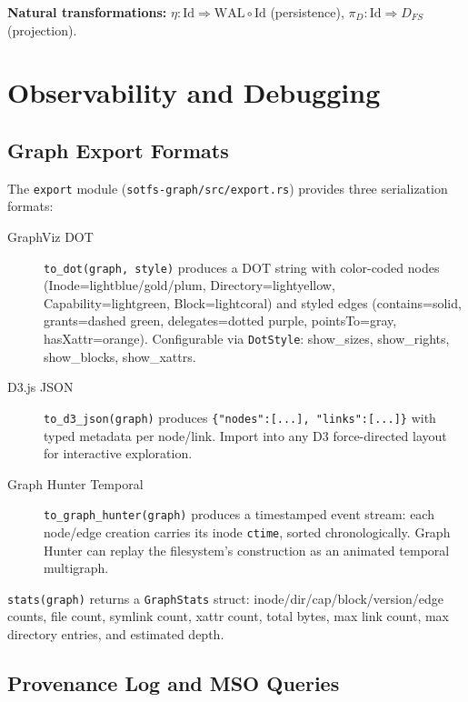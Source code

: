 \documentclass[11pt,a4paper,twoside]{report}
\theoremstyle{definition}
\begin{document}
\textbf{Natural transformations:}
$\eta: \mathrm{Id} \Rightarrow \mathrm{WAL} \circ \mathrm{Id}$ (persistence),
$\pi_D: \mathrm{Id} \Rightarrow D_{FS}$ (projection).

\chapter{Observability and Debugging}

\section{Graph Export Formats}

The \texttt{export} module (\texttt{sotfs-graph/src/export.rs}) provides three serialization formats:

\begin{description}
\item[GraphViz DOT] \texttt{to\_dot(graph, style)} produces a DOT string with
  color-coded nodes (Inode=lightblue/gold/plum, Directory=lightyellow,
  Capability=lightgreen, Block=lightcoral) and styled edges (contains=solid,
  grants=dashed green, delegates=dotted purple, pointsTo=gray, hasXattr=orange).
  Configurable via \texttt{DotStyle}: show\_sizes, show\_rights, show\_blocks, show\_xattrs.

\item[D3.js JSON] \texttt{to\_d3\_json(graph)} produces
  \texttt{\{"nodes":[...], "links":[...]\}} with typed metadata per node/link.
  Import into any D3 force-directed layout for interactive exploration.

\item[Graph Hunter Temporal] \texttt{to\_graph\_hunter(graph)} produces a
  timestamped event stream: each node/edge creation carries its inode
  \texttt{ctime}, sorted chronologically. Graph Hunter can replay the
  filesystem's construction as an animated temporal multigraph.
\end{description}

\texttt{stats(graph)} returns a \texttt{GraphStats} struct: inode/dir/cap/block/version/edge
counts, file count, symlink count, xattr count, total bytes, max link count,
max directory entries, and estimated depth.

\section{Provenance Log and MSO Queries}
\end{document}
